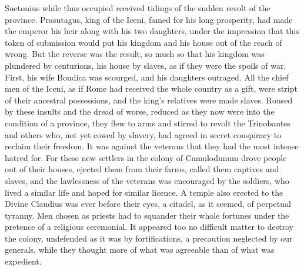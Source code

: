 Suetonius while thus occupied received tidings of the sudden revolt of the province. Prasutagus, king of the Iceni, famed for his long prosperity, had made the emperor his heir along with his two daughters, under the impression that this token of submission would put his kingdom and his house out of the reach of wrong. But the reverse was the result, so much so that his kingdom was plundered by centurions, his house by slaves, as if they were the spoils of war. First, his wife Boudica was scourged, and his daughters outraged. All the chief men of the Iceni, as if Rome had received the whole country as a gift, were stript of their ancestral possessions, and the king's relatives were made slaves. Roused by these insults and the dread of worse, reduced as they now were into the condition of a province, they flew to arms and stirred to revolt the Trinobantes and others who, not yet cowed by slavery, had agreed in secret conspiracy to reclaim their freedom. It was against the veterans that they had the most intense hatred for. For these new settlers in the colony of Camulodunum drove people out of their houses, ejected them from their farms, called them captives and slaves, and the lawlessness of the veterans was encouraged by the soldiers, who lived a similar life and hoped for similar licence. A temple also erected to the Divine Claudius was ever before their eyes, a citadel, as it seemed, of perpetual tyranny. Men chosen as priests had to squander their whole fortunes under the pretence of a religious ceremonial. It appeared too no difficult matter to destroy the colony, undefended as it was by fortifications, a precaution neglected by our generals, while they thought more of what was agreeable than of what was expedient.


